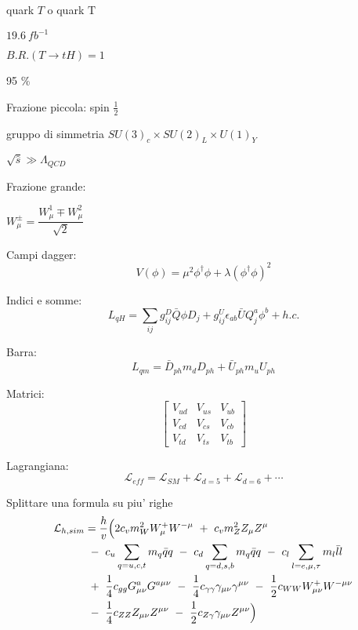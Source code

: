 quark $T$ o quark $\mathrm{T}$

$19.6 ~fb^{-1}$

$B.R.(T\rightarrow tH)=1$

95 \% 

Frazione piccola: spin $\frac{1}{2}$

gruppo di simmetria $SU(3)_{c}\times SU(2)_{L}\times U(1)_{Y}$

$\sqrt{\hat{s}}\gg\Lambda_{QCD}$

Frazione grande:
\begin{center}
 $W_{\mu}^{\pm}=\dfrac{W_{\mu}^{1}\mp W^{2}_{\mu}}{\sqrt{2}}$
\end{center}


Campi dagger:
\begin{equation}
 V(\phi)=\mu^{2}\phi^{\dagger}\phi+\lambda(\phi^{\dagger}\phi)^{2}
\end{equation}

Indici e somme:
\begin{equation}
 L_{qH}=\sum_{ij}g_{ij}^{D}\bar{Q}\phi D_{j}+g_{ij}^{U}\epsilon_{ab}\bar{U}Q^{a}_{j}\phi^{b}+h.c.
\end{equation}

Barra:
\begin{equation}
 L_{qm}=\bar{D}_{ph}m_{d}D_{ph}+\bar{U}_{ph}m_{u}U_{ph}
\end{equation}

Matrici:
\begin{equation}
\begin{bmatrix} V_{ud} & V_{us} & V_{ub} \\ V_{cd} & V_{cs} & V_{cb} \\ V_{td} & V_{ts} & V_{tb} \end{bmatrix}
\end{equation}

Lagrangiana:
\begin{equation}
 \mathcal{L}_{eff}=\mathcal{L}_{SM}+\mathcal{L}_{d=5}+\mathcal{L}_{d=6}+\cdots
\end{equation}

Splittare una formula su piu' righe
\begin{equation}
\begin{split}
 \mathcal{L}_{h,sim}&=\dfrac{h}{v}\Bigl( 2c_v m^2_W W^+_\mu W^{-\mu} ~+ ~c_v m^2_Z Z_\mu Z^{\mu}\\&~- ~c_u\sum_{q=u,c,t}m_q \bar{q}q ~- ~c_d
 \sum_{q=d,s,b}m_q \bar{q}q ~- ~c_l\sum_{l=e,\mu,\tau}m_l \bar{l}l\\& ~+ ~\dfrac{1}{4}c_{gg}G^{a}_{\mu\nu}G^{a\mu\nu} ~- ~\dfrac{1}{4}
 c_{\gamma\gamma}\gamma_{\mu\nu}\gamma^{\mu\nu} ~- ~\dfrac{1}{2}c_{WW}W^{+}_{\mu\nu}W^{-\mu\nu} \\&~- ~\dfrac{1}{4}c_{ZZ}Z_{\mu\nu}Z^{\mu\nu}
 ~- ~\dfrac{1}{2}c_{Z\gamma}\gamma_{\mu\nu}Z^{\mu\nu}\Bigr)
 \end{split}
\end{equation}


